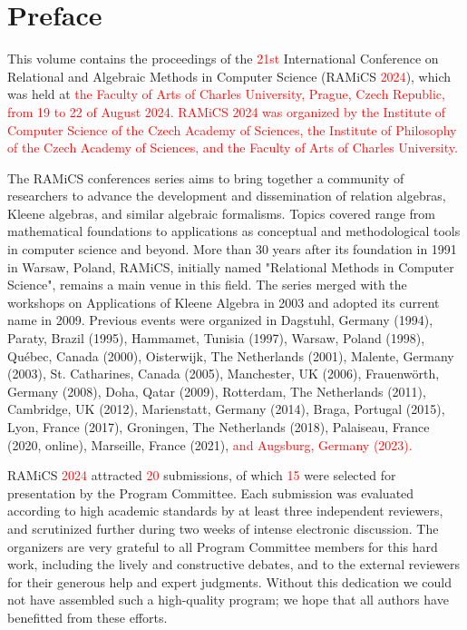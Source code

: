 \documentclass{llncs}
\newcommand{\red}[1]{\textcolor{red}{#1}}
\begin{document}
\section*{Preface}
This volume contains the proceedings of the \red{21st} International
Conference on Relational and Algebraic Methods in Computer Science
(RAMiCS \red{2024}), which was held at \red{the Faculty of Arts of Charles University, 
Prague, Czech Republic, from 19 to 22 of August 2024. RAMiCS 2024 was organized by the Institute of Computer Science of the Czech Academy of Sciences, the Institute of Philosophy of the Czech Academy of Sciences, and the Faculty of Arts of Charles University.}

The RAMiCS conferences series aims to bring together a community of
researchers to advance the development and dissemination of relation
algebras, Kleene algebras, and similar algebraic formalisms. Topics
covered range from mathematical foundations to applications as
conceptual and methodological tools in computer science and
beyond. More than 30 years after its foundation in 1991 in Warsaw,
Poland, RAMiCS, initially named "Relational Methods in Computer
Science", remains a main venue in this field. The series merged with
the workshops on Applications of Kleene Algebra in 2003 and adopted
its current name in 2009. Previous events were organized in Dagstuhl,
Germany (1994), Paraty, Brazil (1995), Hammamet, Tunisia (1997),
Warsaw, Poland (1998), Qu\'ebec, Canada (2000), Oisterwijk, The
Netherlands (2001), Malente, Germany (2003), St. Catharines, Canada
(2005), Manchester, UK (2006), Frauenw\"orth, Germany (2008), Doha,
Qatar (2009), Rotterdam, The Netherlands (2011), Cambridge, UK (2012),
Marienstatt, Germany (2014), Braga, Portugal (2015), Lyon, France
(2017), Groningen, The Netherlands (2018), Palaiseau, France (2020,
online), Marseille, France (2021),\red{ and Augsburg, Germany (2023).}

RAMiCS \red{2024} attracted \red{20} submissions, of which \red{15} were
selected for presentation by the Program Committee. Each submission
was evaluated according to high academic standards by at least three
independent reviewers, and scrutinized further during two weeks of
intense electronic discussion. The organizers are very grateful to all
Program Committee members for this hard work, including the lively and
constructive debates, and to the external reviewers for their generous
help and expert judgments. Without this dedication we could not have
assembled such a high-quality program; we hope that all authors have
benefitted from these efforts.
\end{document}
